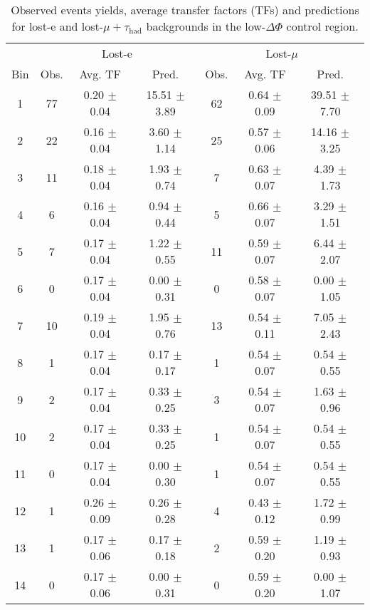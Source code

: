 \begin{table}[h!]
\centering
\caption{Observed events yields, average transfer factors (TFs) and predictions for lost-e and 
lost-$\mu+\tau_{\text{had}}$ backgrounds in the low-$\Delta\Phi$ control region.}
\label{tab:lostLeptonPredictions_LDP}
\begin{tabular}{c|c|c|c|c|c|c}
\hline
     &  \multicolumn{3}{c}{Lost-e} & \multicolumn{3}{c}{Lost-$\mu$} \\\cline{2-7}
Bin & Obs. & Avg. TF & Pred. & Obs. & Avg. TF &  Pred. \\ 
\hline \hline
1 & 77  & 0.20  $\pm$  0.04  & 15.51 $\pm$ 3.89 & 62  & 0.64  $\pm$  0.09  & 39.51 $\pm$ 7.70    \\\hline
2 & 22  & 0.16  $\pm$  0.04  & 3.60 $\pm$ 1.14 & 25  & 0.57  $\pm$  0.06  & 14.16 $\pm$ 3.25    \\\hline
3 & 11  & 0.18  $\pm$  0.04  & 1.93 $\pm$ 0.74 & 7  & 0.63  $\pm$  0.07  & 4.39 $\pm$ 1.73    \\\hline
4 & 6  & 0.16  $\pm$  0.04  & 0.94 $\pm$ 0.44 & 5  & 0.66  $\pm$  0.07  & 3.29 $\pm$ 1.51    \\\hline
5 & 7  & 0.17  $\pm$  0.04  & 1.22 $\pm$ 0.55 & 11  & 0.59  $\pm$  0.07  & 6.44 $\pm$ 2.07    \\\hline
6 & 0  & 0.17  $\pm$  0.04  & 0.00 $\pm$ 0.31 & 0  & 0.58  $\pm$  0.07  & 0.00 $\pm$ 1.05    \\\hline
7 & 10  & 0.19  $\pm$  0.04  & 1.95 $\pm$ 0.76 & 13  & 0.54  $\pm$  0.11  & 7.05 $\pm$ 2.43    \\\hline
8 & 1  & 0.17  $\pm$  0.04  & 0.17 $\pm$ 0.17 & 1  & 0.54  $\pm$  0.07  & 0.54 $\pm$ 0.55    \\\hline
9 & 2  & 0.17  $\pm$  0.04  & 0.33 $\pm$ 0.25 & 3  & 0.54  $\pm$  0.07  & 1.63 $\pm$ 0.96    \\\hline
10 & 2  & 0.17  $\pm$  0.04  & 0.33 $\pm$ 0.25 & 1  & 0.54  $\pm$  0.07  & 0.54 $\pm$ 0.55    \\\hline
11 & 0  & 0.17  $\pm$  0.04  & 0.00 $\pm$ 0.30 & 1  & 0.54  $\pm$  0.07  & 0.54 $\pm$ 0.55    \\\hline
12 & 1  & 0.26  $\pm$  0.09  & 0.26 $\pm$ 0.28 & 4  & 0.43  $\pm$  0.12  & 1.72 $\pm$ 0.99    \\\hline
13 & 1  & 0.17  $\pm$  0.06  & 0.17 $\pm$ 0.18 & 2  & 0.59  $\pm$  0.20  & 1.19 $\pm$ 0.93    \\\hline
14 & 0  & 0.17  $\pm$  0.06  & 0.00 $\pm$ 0.31 & 0  & 0.59  $\pm$  0.20  & 0.00 $\pm$ 1.07    \\\hline

\end{tabular}
\end{table}
